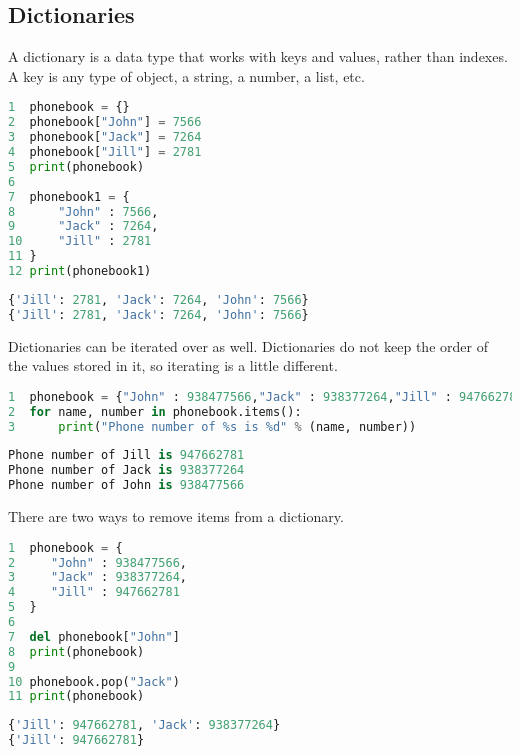 \documentclass[crop=false,class=book]{standalone}
\begin{document}
\subsection{Dictionaries}
A dictionary is a data type that works with keys and values, rather than indexes. A key is any type of object, a string, a number, a list, etc.\newline
\begin{minipage}[t]{.48\textwidth}
\begin{lstlisting}[language=python,frame=single,basicstyle=\footnotesize,frame=single,caption=input]
1  phonebook = {}
2  phonebook["John"] = 7566
3  phonebook["Jack"] = 7264
4  phonebook["Jill"] = 2781
5  print(phonebook)
6
7  phonebook1 = {
8      "John" : 7566,
9      "Jack" : 7264,
10     "Jill" : 2781
11 }
12 print(phonebook1)
\end{lstlisting}
\end{minipage}\hfill
\begin{minipage}[t]{.48\textwidth}
\begin{lstlisting}[language=python,frame=single,basicstyle=\footnotesize,frame=single,caption=output]
{'Jill': 2781, 'Jack': 7264, 'John': 7566}
{'Jill': 2781, 'Jack': 7264, 'John': 7566}
\end{lstlisting}
\end{minipage}
Dictionaries can be iterated over as well. Dictionaries do not keep the order of the values stored in it, so iterating is a little different.
\begin{lstlisting}[language=python,frame=single,basicstyle=\footnotesize,frame=single,caption=output]
1  phonebook = {"John" : 938477566,"Jack" : 938377264,"Jill" : 947662781}
2  for name, number in phonebook.items():
3      print("Phone number of %s is %d" % (name, number))
\end{lstlisting}
\begin{lstlisting}[language=python,frame=single,basicstyle=\footnotesize,frame=single,caption=output]
Phone number of Jill is 947662781
Phone number of Jack is 938377264
Phone number of John is 938477566
\end{lstlisting}
There are two ways to remove items from a dictionary.\newline
\begin{minipage}[t]{.48\textwidth}
\begin{lstlisting}[language=python,frame=single,basicstyle=\footnotesize,frame=single,caption=output]
1  phonebook = {
2     "John" : 938477566,
3     "Jack" : 938377264,
4     "Jill" : 947662781
5  }
6
7  del phonebook["John"]
8  print(phonebook)
9
10 phonebook.pop("Jack")
11 print(phonebook)
\end{lstlisting}
\end{minipage}\hfill
\begin{minipage}[t]{.48\textwidth}
\begin{lstlisting}[language=python,frame=single,basicstyle=\footnotesize,caption=output]
{'Jill': 947662781, 'Jack': 938377264}
{'Jill': 947662781}
\end{lstlisting}
\end{minipage}\newline
\end{document}
